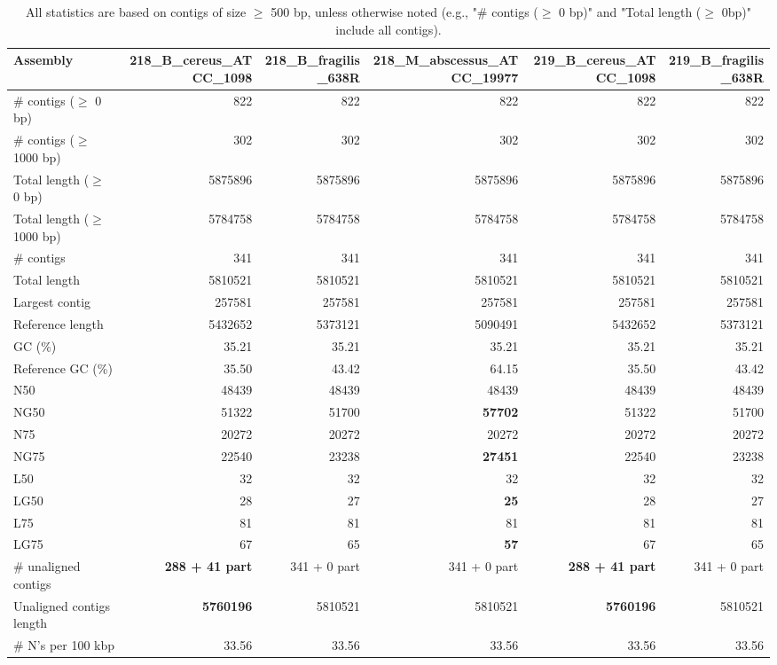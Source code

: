 \documentclass[12pt,a4paper]{article}
\begin{document}
\begin{table}[ht]
\begin{center}
\caption{All statistics are based on contigs of size $\geq$ 500 bp, unless otherwise noted (e.g., "\# contigs ($\geq$ 0 bp)" and "Total length ($\geq$ 0bp)" include all contigs).}
\begin{tabular}{|l*{5}{|r}|}
\hline
Assembly & 218\_B\_cereus\_ATCC\_1098 & 218\_B\_fragilis\_638R & 218\_M\_abscessus\_ATCC\_19977 & 219\_B\_cereus\_ATCC\_1098 & 219\_B\_fragilis\_638R \\ \hline
\# contigs ($\geq$ 0 bp) & 822 & 822 & 822 & 822 & 822 \\ \hline
\# contigs ($\geq$ 1000 bp) & 302 & 302 & 302 & 302 & 302 \\ \hline
Total length ($\geq$ 0 bp) & 5875896 & 5875896 & 5875896 & 5875896 & 5875896 \\ \hline
Total length ($\geq$ 1000 bp) & 5784758 & 5784758 & 5784758 & 5784758 & 5784758 \\ \hline
\# contigs & 341 & 341 & 341 & 341 & 341 \\ \hline
Total length & 5810521 & 5810521 & 5810521 & 5810521 & 5810521 \\ \hline
Largest contig & 257581 & 257581 & 257581 & 257581 & 257581 \\ \hline
Reference length & 5432652 & 5373121 & 5090491 & 5432652 & 5373121 \\ \hline
GC (\%) & 35.21 & 35.21 & 35.21 & 35.21 & 35.21 \\ \hline
Reference GC (\%) & 35.50 & 43.42 & 64.15 & 35.50 & 43.42 \\ \hline
N50 & 48439 & 48439 & 48439 & 48439 & 48439 \\ \hline
NG50 & 51322 & 51700 & {\bf 57702} & 51322 & 51700 \\ \hline
N75 & 20272 & 20272 & 20272 & 20272 & 20272 \\ \hline
NG75 & 22540 & 23238 & {\bf 27451} & 22540 & 23238 \\ \hline
L50 & 32 & 32 & 32 & 32 & 32 \\ \hline
LG50 & 28 & 27 & {\bf 25} & 28 & 27 \\ \hline
L75 & 81 & 81 & 81 & 81 & 81 \\ \hline
LG75 & 67 & 65 & {\bf 57} & 67 & 65 \\ \hline
\# unaligned contigs & {\bf 288 + 41 part} & 341 + 0 part & 341 + 0 part & {\bf 288 + 41 part} & 341 + 0 part \\ \hline
Unaligned contigs length & {\bf 5760196} & 5810521 & 5810521 & {\bf 5760196} & 5810521 \\ \hline
\# N's per 100 kbp & 33.56 & 33.56 & 33.56 & 33.56 & 33.56 \\ \hline
\end{tabular}
\end{center}
\end{table}
\end{document}
